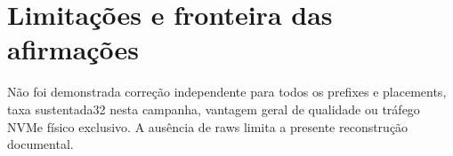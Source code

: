\section{Limitações e fronteira das afirmações}
Não foi demonstrada correção independente para todos os prefixes e placements, taxa sustentada32 nesta campanha, vantagem geral de qualidade ou tráfego NVMe físico exclusivo. A ausência de raws limita a presente reconstrução documental. 

